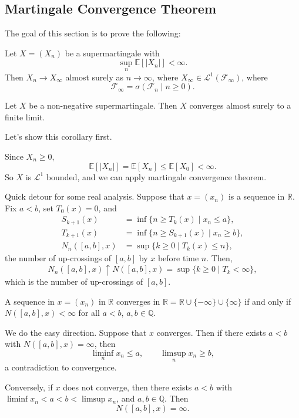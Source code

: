 \documentclass[12pt]{article}
\begin{document}
\subsection{Martingale Convergence Theorem}%
\label{sub:martct}

The goal of this section is to prove the following:

\begin{theorem}
	Let $X = (X_n)$ be a supermartingale with
	\[
	\sup_n \mathbb{E}[|X_n|] < \infty.
	\]
	Then $X_n \to X_\infty$ almost surely as $n \to \infty$, where $X_\infty \in \mathcal{L}^1(\mathcal{F}_\infty)$, where
	\[
	\mathcal{F}_\infty = \sigma(\mathcal{F}_n \mid n \geq 0).
	\]
\end{theorem}

\begin{corollary}
	Let $X$ be a non-negative supermartingale. Then $X$ converges almost surely to a finite limit.
\end{corollary}

Let's show this corollary first.

\begin{proofbox}
	Since $X_n \geq 0$,
	\[
	\mathbb{E}[|X_n|] = \mathbb{E}[X_n] \leq \mathbb{E}[X_0] < \infty.
	\]
	So $X$ is $\mathcal{L}^1$ bounded, and we can apply martingale convergence theorem.
\end{proofbox}

Quick detour for some real analysis. Suppose that $x = (x_n)$ is a sequence in $\mathbb{R}$. Fix $a < b$, set $T_0(x) = 0$, and
\begin{align*}
	S_{k+1}(x) &= \inf \{n \geq T_k(x) \mid x_n \leq a\}, \\
	T_{k+1}(x) &= \inf \{n \geq S_{k+1}(x) \mid x_n \geq b\}, \\
	N_n([a, b], x) &= \sup\{k \geq 0 \mid T_k(x) \leq n\},
\end{align*}
the number of up-crossings of $[a, b]$ by $x$ before time $n$. Then,
\[
	N_n([a, b], x) \uparrow N([a, b], x) = \sup\{k \geq 0 \mid T_k < \infty\},
\]
which is the number of up-crossings of $[a, b]$.

\begin{lemma}
	A sequence in $x = (x_n)$ in $\mathbb{R}$ converges in $\mathbb{R} = \mathbb{R} \cup \{-\infty\} \cup \{\infty\}$ if and only if $N([a, b], x) < \infty$ for all $a < b$, $a, b \in \mathbb{Q}$.
\end{lemma}

\begin{proofbox}
	We do the easy direction. Suppose that $x$ converges. Then if there exists $a < b$ with $N([a, b], x) = \infty$, then
	\[
	\liminf_n x_n \leq a, \qquad \limsup_n x_n \geq b,
	\]
	a contradiction to convergence.

	Conversely, if $x$ does not converge, then there exists $a < b$ with $\liminf x_n < a < b < \limsup x_n$, and $a, b \in \mathbb{Q}$. Then
	\[
		N([a, b], x) = \infty.
	\]
\end{proofbox}
\end{document}
